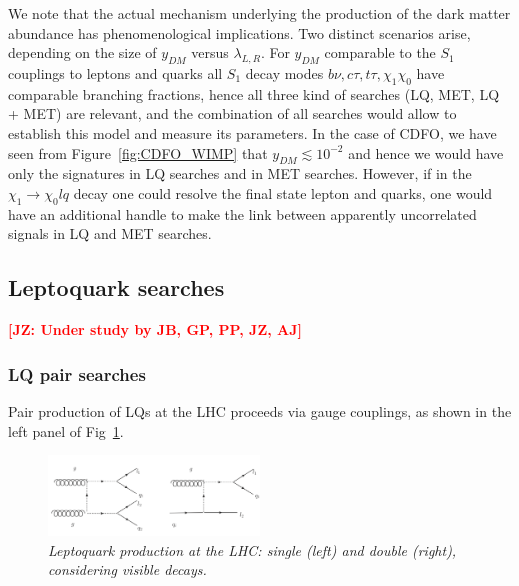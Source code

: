 \documentclass[11pt]{cernrep}
\def\JZ#1{{\bf  \textcolor{red}{[JZ: {#1}]}}}
\begin{document}
We note that the actual mechanism underlying the production of the dark matter abundance has phenomenological implications. Two distinct scenarios arise, depending on the size of $y_{DM}$ versus $\lambda_{L,R}$. For $y_{DM}$ comparable to the $S_1$ couplings to leptons and quarks all $S_1$ decay modes $b \nu, c \tau, t \tau, \chi_1 \chi_0$ have comparable branching fractions, hence all three kind of searches (LQ, MET, LQ + MET) are relevant, and the combination of all searches would allow to establish this model and measure its parameters. In the case of CDFO, we have seen from Figure~\ref{fig:CDFO_WIMP} that $y_{DM} \lesssim 10^{-2}$ and hence we would have only the signatures in LQ searches and in MET searches. However, if in the $\chi_1 \to \chi_0 l q$ decay one could resolve the final state lepton and quarks, one would have an additional handle to make the link between apparently uncorrelated signals in LQ and MET searches.




\subsection{Leptoquark searches}

\JZ{Under study by JB, GP, PP, JZ, AJ}

\subsubsection{LQ pair searches}

Pair production of LQs at the LHC proceeds via gauge couplings, as shown in the left panel of Fig~\ref{fig:LQvisible}.

 \begin{figure}[!htp]
  \centering
  \includegraphics[width=0.5\textwidth]{./figures/LQ_visible.png} 
  \caption{\it Leptoquark production at the LHC: single (left) and double (right), considering visible decays.}
\label{fig:LQvisible}
\end{figure}
\end{document}
